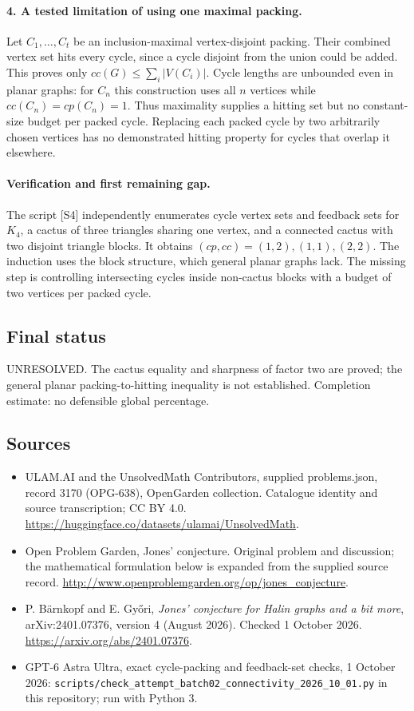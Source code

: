 \documentclass[11pt,a4paper]{article}
\begin{document}
\paragraph{4. A tested limitation of using one maximal packing.}
Let $C_1,\ldots,C_t$ be an inclusion-maximal vertex-disjoint packing.
Their combined vertex set hits every cycle, since a cycle disjoint
from the union could be added. This proves only
$cc(G)\le\sum_i|V(C_i)|$. Cycle lengths are unbounded even in planar
graphs: for $C_n$ this construction uses all $n$ vertices while
$cc(C_n)=cp(C_n)=1$. Thus maximality supplies a hitting set but no
constant-size budget per packed cycle. Replacing each packed cycle
by two arbitrarily chosen vertices has no demonstrated hitting
property for cycles that overlap it elsewhere.

\paragraph{Verification and first remaining gap.}
The script [S4] independently enumerates cycle vertex sets and feedback
sets for $K_4$, a cactus of three triangles sharing one vertex, and
a connected cactus with two disjoint triangle blocks. It obtains
$(cp,cc)=(1,2),(1,1),(2,2)$. The induction uses the block structure,
which general planar graphs lack. The missing step is controlling
intersecting cycles inside non-cactus blocks with a budget of two
vertices per packed cycle.

\subsection{Final status}
UNRESOLVED. The cactus equality and sharpness of factor two are proved;
the general planar packing-to-hitting inequality is not established.
Completion estimate: no defensible global percentage.

\subsection{Sources}
\begin{itemize}
\item[S1] ULAM.AI and the UnsolvedMath Contributors, supplied problems.json, record 3170 (OPG-638), OpenGarden collection. Catalogue identity and source transcription; CC BY 4.0.
\url{https://huggingface.co/datasets/ulamai/UnsolvedMath}.
\item[S2] Open Problem Garden, Jones' conjecture. Original problem and discussion; the mathematical formulation below is expanded from the supplied source record.
\url{http://www.openproblemgarden.org/op/jones_conjecture}.
\item[S3] P. Bärnkopf and E. Győri, \emph{Jones' conjecture for Halin graphs and a bit more}, arXiv:2401.07376, version 4 (August 2026). Checked 1 October 2026.
\url{https://arxiv.org/abs/2401.07376}.
\item[S4] GPT-6 Astra Ultra, exact cycle-packing and feedback-set checks, 1 October 2026: \texttt{scripts/check\_attempt\_batch02\_connectivity\_2026\_10\_01.py} in this repository; run with Python 3.
\end{itemize}
\end{document}
